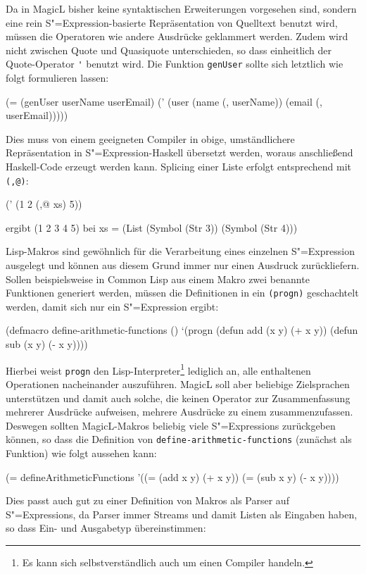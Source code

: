 \documentclass[11pt, a4paper, bibgerm]{scrbook}
\newcommand\icode[1]{\lstinline?#1?}
\newcommand{\sexp}{S"=Expression}
\newcommand{\sexps}{S"=Expressions}
\begin{document}
Da in MagicL bisher keine syntaktischen Erweiterungen vorgesehen sind,
sondern eine rein \sexp{}-basierte Repräsentation von Quelltext benutzt
wird, müssen die Operatoren wie andere Ausdrücke geklammert
werden. Zudem wird nicht zwischen Quote und Quasiquote unterschieden, so
dass einheitlich der Quote-Operator \icode{'} benutzt wird. Die Funktion
\icode{genUser} sollte sich letztlich wie folgt formulieren lassen:
\begin{code}
(= (genUser userName userEmail)
   (' (user (name (, userName)) (email (, userEmail)))))
\end{code}
Dies muss von einem geeigneten Compiler in obige, umständlichere
Repräsentation in \sexp{}-Haskell übersetzt werden, woraus anschließend
Haskell-Code erzeugt werden kann. Splicing einer Liste erfolgt
entsprechend mit \icode{(,@)}:
\begin{code}
(' (1 2 (,@ xs) 5))

ergibt (1 2 3 4 5) bei xs = (List (Symbol (Str 3))
                                  (Symbol (Str 4)))
\end{code}
Lisp-Makros sind gewöhnlich für die Verarbeitung eines einzelnen \sexp{}
ausgelegt und können aus diesem Grund immer nur einen Ausdruck
zurückliefern. Sollen beispielsweise in Common Lisp aus einem Makro
zwei benannte Funktionen generiert werden, müssen die Definitionen in
ein \icode{(progn)} geschachtelt werden, damit sich nur ein \sexp{}
ergibt:
\begin{code}
(defmacro define-arithmetic-functions ()
  `(progn (defun add (x y) (+ x y))
          (defun sub (x y) (- x y))))
\end{code}
Hierbei weist \icode{progn} den Lisp-Interpreter\footnote{Es kann sich
  selbstverständlich auch um einen Compiler handeln.} lediglich an, alle
enthaltenen Operationen nacheinander auszuführen. MagicL soll aber
beliebige Zielsprachen unterstützen und damit auch solche, die keinen
Operator zur Zusammenfassung mehrerer Ausdrücke aufweisen, mehrere
Ausdrücke zu einem zusammenzufassen. Deswegen sollten MagicL-Makros
beliebig viele \sexps{} zurückgeben können, so dass die Definition von
\icode{define-arithmetic-functions} (zunächst als Funktion) wie folgt
aussehen kann:
\begin{code}
(= defineArithmeticFunctions
  '((= (add x y) (+ x y))
    (= (sub x y) (- x y))))
\end{code}
Dies passt auch gut zu einer Definition von Makros als Parser auf
\sexps{}, da Parser immer Streams und damit Listen als Eingaben haben,
so dass Ein- und Ausgabetyp übereinstimmen:
\end{document}
